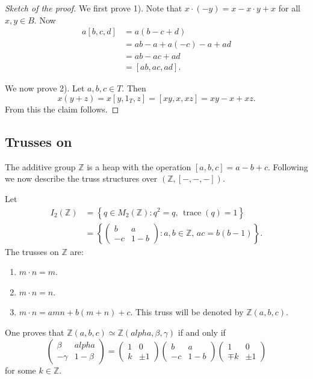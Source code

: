 \documentclass{svmult}
\def\alpha{alpha}%
\def\({}%
\def\){}%
\newcommand{\Z}{\mathbb{Z}}
\begin{document}
\begin{proof}[Sketch of the proof]
    We first prove 1). Note that 
    $x\cdot(-y)=x-x\cdot y+x$ for all $x,y\in B$. Now 
    \begin{align*}
    a [b,c,d]&=a (b-c+d)\\
    &=a b-a+a(-c)-a+ad\\
    &=a b-ac+ad\\
    &=[ab,ac,ad].
    \end{align*}
    
    We now prove 2). Let $a,b,c\in T$. Then 
    \[
    x(y+z)=x[y,1_T,z]=[xy,x,xz]=xy-x+xz.
    \]
    From this the claim follows. 
\end{proof}

\subsection{Trusses on \(\Z\)}

The additive group $\Z$ is a heap with the operation $[a,b,c]=a-b+c$. Following
\cite{MR4048518} we now describe the truss structures over $\left(\Z,[-,-,-]\right)$. 

Let 
\begin{align*}
    I_2(\Z) &= \left\{q\in M_2(\Z):q^2=q,\,\operatorname{trace}(q)=1\right\}\\
    &=\left\{\begin{pmatrix}
        b & a\\
        -c & 1-b
    \end{pmatrix}:a,b\in\Z,\,ac=b(b-1)\right\}.
\end{align*}
The trusses on $\Z$ are:
\begin{enumerate}
    \item $m\cdot n=m$.
    \item $m\cdot n=n$.
    \item $m\cdot n=amn+b(m+n)+c$. This truss will be denoted by $\Z(a,b,c)$. 
\end{enumerate}

One proves that $\Z(a,b,c)\simeq\Z(\alpha,\beta,\gamma)$ if and only if
\[
\begin{pmatrix}
\beta & \alpha\\
-\gamma & 1-\beta
\end{pmatrix}
=\begin{pmatrix}
1&0\\k&\pm 1
\end{pmatrix}
\begin{pmatrix}
b & a\\
-c & 1-b
\end{pmatrix}
\begin{pmatrix}
1&0\\ \mp k&\pm1
\end{pmatrix}
\]
for some $k\in\Z$. 
\end{document}
